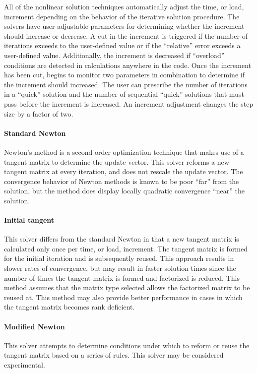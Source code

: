 All of the nonlinear solution techniques automatically adjust the time, or
load, increment depending on the behavior of the iterative solution
procedure.  The solvers have user-adjustable parameters for determining
whether the increment should increase or decrease.  A cut in the increment
is triggered if the number of iterations exceeds to the user-defined value
or if the ``relative'' error exceeds a user-defined value.  Additionally, the
increment is decreased if ``overload'' conditions are detected in
calculations anywhere in the code.  Once the increment has been cut, \tahoe
begins to monitor two parameters in combination to determine if the
increment should increased.  The user can prescribe the number of
iterations in a ``quick'' solution and the number of sequential ``quick''
solutions that must pass before the increment is increased.  An increment
adjustment changes the step size by a factor of two.

\paragraph{Standard Newton}
Newton's method is a second order optimization technique that makes use of
a tangent matrix to determine the update vector.  This solver reforms a new
tangent matrix at every iteration, and does not rescale the update vector. 
The convergence behavior of Newton methods is known to be poor ``far'' from
the solution, but the method does display locally quadratic convergence
``near'' the solution.

\paragraph{Initial tangent}
This solver differs from the standard Newton in that a new tangent matrix
is calculated only once per time, or load, increment.  The tangent matrix
is formed for the initial iteration and is subsequently reused.  This
approach results in slower rates of convergence, but may result in faster
solution times since the number of times the tangent matrix is formed and
factorized is reduced.  This method assumes that the matrix type selected
allows the factorized matrix to be reused at.  This method may also provide
better performance in cases in which the tangent matrix becomes rank
deficient.

\paragraph{Modified Newton}
This solver attempts to determine conditions under which to reform or reuse
the tangent matrix based on a series of rules.  This solver may be
considered experimental.

